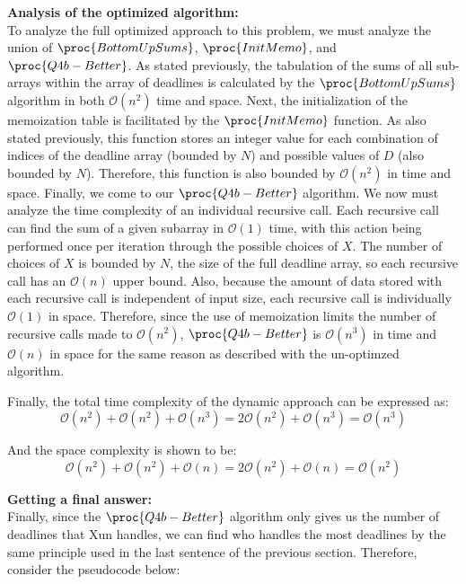 \textbf{Analysis of the optimized algorithm:}\\
To analyze the full optimized approach to this problem, we must analyze the union of $\proc{BottomUpSums}$, $\proc{InitMemo}$, and $\proc{Q4b-Better}$.
As stated previously, the tabulation of the sums of all sub-arrays within the array of deadlines is calculated by the $\proc{BottomUpSums}$ algorithm in both $\mathcal{O}(n^2)$ time and space.
Next, the initialization of the memoization table is facilitated by the $\proc{InitMemo}$ function.
As also stated previously, this function stores an integer value for each combination of indices of the deadline array (bounded by $N$) and possible values of $D$ (also bounded by $N$).
Therefore, this function is also bounded by $\mathcal{O}(n^2)$ in time and space.
Finally, we come to our $\proc{Q4b-Better}$ algorithm.
We now must analyze the time complexity of an individual recursive call.
Each recursive call can find the sum of a given subarray in $\mathcal{O}(1)$ time, with this action being performed once per iteration through the possible choices of $X$.
The number of choices of $X$ is bounded by $N$, the size of the full deadline array, so each recursive call has an $\mathcal{O}(n)$ upper bound.
Also, because the amount of data stored with each recursive call is independent of input size, each recursive call is individually $\mathcal{O}(1)$ in space.
Therefore, since the use of memoization limits the number of recursive calls made to $\mathcal{O}(n^2)$, $\proc{Q4b-Better}$ is $\mathcal{O}(n^3)$ in time and $\mathcal{O}(n)$ in space for the same reason as described with the un-optimzed algorithm.

Finally, the total time complexity of the dynamic approach can be expressed as:
\[\mathcal{O}(n^2) + \mathcal{O}(n^2) + \mathcal{O}(n^3) = 2\mathcal{O}(n^2) + \mathcal{O}(n^3) = \mathcal{O}(n^3)\]

And the space complexity is shown to be:
\[\mathcal{O}(n^2) + \mathcal{O}(n^2) + \mathcal{O}(n) = 2\mathcal{O}(n^2) + \mathcal{O}(n) = \mathcal{O}(n^2)\]

\textbf{Getting a final answer:}\\
Finally, since the $\proc{Q4b-Better}$ algorithm only gives us the number of deadlines that Xun handles, we can find who handles the most deadlines by the same principle used in the last sentence of the previous section.
Therefore, consider the pseudocode below:

